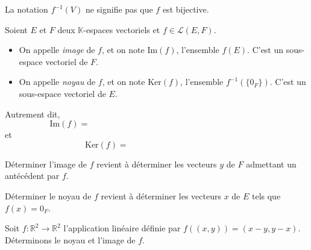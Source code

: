 \documentclass[a4paper,10pt]{report}
\begin{document}
 \begin{att} La notation $f^{-1}(V)$ ne signifie pas que $f$ est bijective.
 \end{att}
 
 \begin{defip} Soient $E$ et $F$ deux $\mathbb{K}$-espaces vectoriels et $f \in \mathcal{L}(E,F)$.
\begin{itemize}
 \item On appelle \textit{image} de $f$, et on note $\textrm{Im}(f)$, l'ensemble $f(E)$. C'est un sous-espace vectoriel de $F$.
 \item On appelle \textit{noyau} de $f$, et on note $\textrm{Ker}(f)$, l'ensemble $f^{-1}(\lbrace 0_F \rbrace)$. C'est un sous-espace vectoriel de $E$.
 \end{itemize}
 \end{defip}
 
 \noindent Autrement dit,
$$ \textrm{Im}(f)= \phantom{\lbrace f(x) \, \vert \, x \in E \rbrace = \lbrace y \in F \, \vert \, \exists x \in E, \, y=f(x) \rbrace}$$
et
$$ \textrm{Ker}(f) = \phantom{ bla bl a\lbrace x \in E \, \vert \,  f(x)= 0_F \rbrace}$$

\medskip

 \begin{rems} 
 \item Déterminer l'image de $f$ revient à déterminer les vecteurs $y$ de $F$ admettant un antécédent par $f$.
 \item Déterminer le noyau de $f$ revient à déterminer les vecteurs $x$ de $E$ tels que $f(x)= 0_F$.
 \end{rems}
 
 \newpage
 
 \begin{ex} Soit $f : \mathbb{R}^2 \rightarrow \mathbb{R}^2$ l'application linéaire définie par $f((x,y))=(x-y,y-x)$. Déterminons le noyau et l'image de $f$.
 
% 

\vspace{7cm}
\end{ex}
\end{document}
